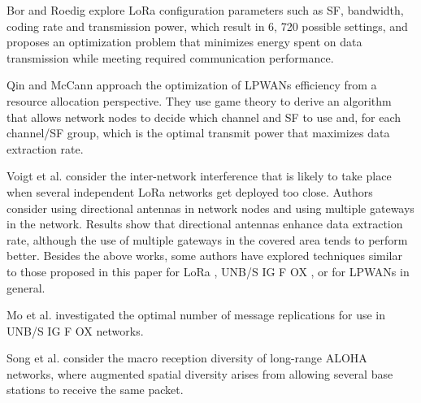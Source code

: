 Bor and Roedig \cite{bor_lora_2017} explore LoRa configuration parameters such as SF,
	bandwidth,
	coding rate and transmission power,
	which result in 6, 720 possible settings,
	and proposes an optimization problem that minimizes energy spent on data transmission while meeting required communication performance.

Qin and McCann \cite{qin_resource_2017} approach the optimization of LPWANs efficiency from a resource allocation perspective.
They use game theory to derive an algorithm that allows network nodes to decide which channel and SF to use and,
	for each channel/SF group,
	which is the optimal transmit power that maximizes data extraction rate.

Voigt et al.
\cite{voigt_mitigating_2016} consider the inter-network interference that is likely to take place when several independent LoRa networks get deployed too close.
Authors consider using directional antennas in network nodes and using multiple gateways in the network.
Results show that directional antennas enhance data extraction rate,
	although the use of multiple gateways in the covered area tends to perform better.
Besides the above works,
	some authors have explored techniques similar to those proposed in this paper for LoRa ,
	UNB/S IG F OX ,
	or for LPWANs in general.

Mo et al.
\cite{mo_optimization_2016} investigated the optimal number of message replications for use in UNB/S IG F OX networks.

Song et al.
\cite{song_evaluation_2017} consider the macro reception diversity of long-range ALOHA networks,
	where augmented spatial diversity arises from allowing several base stations to receive the same packet.

